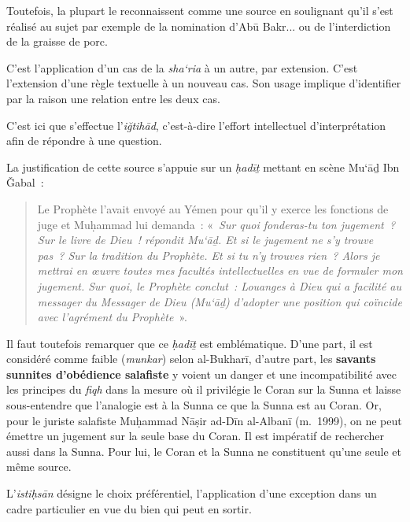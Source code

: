 Toutefois, la plupart le reconnaissent comme une source en soulignant
qu'il s'est réalisé au sujet par exemple de la nomination d'Abū Bakr...
ou de l'interdiction de la graisse de porc.


C'est l'application d'un cas de la \emph{sha`ria} à un autre, par
extension. C'est l'extension d'une règle textuelle à un nouveau cas. Son
usage implique d'identifier par la raison une relation entre les deux
cas. 
\begin{Def}[{iğtihād}]
C'est ici que s'effectue l'\emph{iğtihād}, c'est-à-dire l'effort
intellectuel d'interprétation afin de répondre à une question.
\end{Def}
 La
justification de cette source s'appuie sur un \emph{ḥadīṯ} mettant en
scène Mu`āḏ Ibn Ǧabal~:
\begin{quote}
    Le Prophète l'avait envoyé au Yémen pour qu'il y exerce les fonctions de
juge et Muḥammad lui demanda~: «~\emph{Sur quoi fonderas-tu ton
jugement~? Sur le livre de Dieu~! répondit Mu`āḏ. Et si le jugement ne
s'y trouve pas~? Sur la tradition du Prophète. Et si tu n'y trouves
rien~? Alors je mettrai en œuvre toutes mes facultés intellectuelles en
vue de formuler mon jugement. Sur quoi, le Prophète conclut~: Louanges à
Dieu qui a facilité au messager du Messager de Dieu (Mu`āḏ) d'adopter
une position qui coïncide avec l'agrément du Prophète}~».
\end{quote}


 

Il faut toutefois remarquer que ce \emph{ḥadīṯ} est emblématique. D'une
part, il est considéré comme faible (\emph{munkar}) selon al-Bukharī,
d'autre part, les \textbf{savants sunnites d'obédience salafiste} y
voient un danger et une incompatibilité avec les principes du
\emph{fiqh} dans la mesure où il privilégie le Coran sur la Sunna et
laisse sous-entendre que l'analogie est à la Sunna ce que la Sunna est
au Coran. Or, pour le juriste salafiste Muḥammad Nāṣir ad-Dīn al-Albanī
(m.~1999), on ne peut émettre un jugement sur la seule base du Coran. Il
est impératif de rechercher aussi dans la Sunna. Pour lui, le Coran et
la Sunna ne constituent qu'une seule et même source.

\begin{Def}[istiḥsān]
L'\emph{istiḥsān} désigne le choix préférentiel, l'application d'une
exception dans un cadre particulier en vue du bien qui peut en sortir.
\end{Def}

